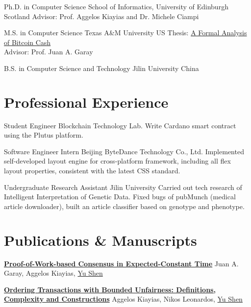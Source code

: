 \documentclass[11pt,a4paper,sans]{moderncv}
\begin{document}
{Ph.D. in Computer Science}
{School of Informatics, University of Edinburgh}
{Scotland}
{}
{Advisor: Prof. Aggelos Kiayias and Dr. Michele Ciampi}

{M.S. in Computer Science}
{Texas A\&M University}
{}
{US}
{Thesis: \href{https://oaktrust.library.tamu.edu/bitstream/handle/1969.1/195819/SHEN-THESIS-2021.pdf}{A Formal Analysis of Bitcoin Cash} \\Advisor: Prof. Juan A. Garay}

{B.S. in Computer Science and Technology}
{Jilin University}
{}
{China}
{}


\section{Professional Experience}

{Student Engineer}
{Blockchain Technology Lab.}
{}
{}
{Write Cardano smart contract using the Plutus platform.}

{Software Engineer Intern}
{Beijing ByteDance Technology Co., Ltd.}
{}
{}
{Implemented self-developed layout engine for cross-platform framework, including all flex layout properties, consistent with the latest CSS standard.}

{Undergraduate Research Assistant}
{Jilin University}
{}
{}
{Carried out tech research of Intelligent Interpretation of Genetic Data. Fixed bugs of pubMunch (medical article downloader), built an article classifier based on genotype and phenotype.}


\section{Publications \& Manuscripts}

{\textbf{\href{https://eprint.iacr.org/2023/1663.pdf}{Proof-of-Work-based Consensus in Expected-Constant Time}}}
{}
{}
{}
{\normalsize Juan A. Garay, Aggelos Kiayias, \underline{Yu Shen}}

{\textbf{\href{https://eprint.iacr.org/2023/1253.pdf}{Ordering Transactions with Bounded Unfairness: Definitions, Complexity and Constructions}}}
{}
{}
{}
{\normalsize Aggelos Kiayias, Nikos Leonardos, \underline{Yu Shen}}
\end{document}
